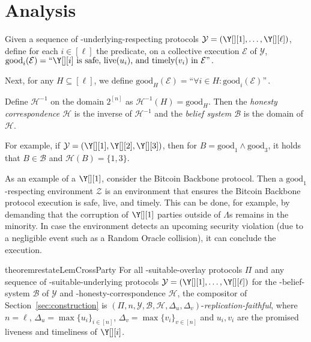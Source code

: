 \section{Analysis}\label{sec:analysis}

\begin{definition}
  Given a sequence of \rollerblade-underlying-respecting
  protocols $\mathcal{Y} = (\Y[][1], \ldots, \Y[][\ell])$,
  define for each $i \in [\ell]$ the predicate, on
  a collective execution $\mathcal{E}$ of $\mathcal{Y}$,
  $
  \text{good}_i(\mathcal{E}) = \text{``} \Y[][i] \text{ is safe, live$(u_i)$, and timely$(v_i)$ in $\mathcal{E}$''}\,.
  $

  Next, for any $H \subseteq [\ell]$, we define
  $
    \text{good}_H(\mathcal{E}) = \text{``}\forall i \in H: \text{good}_i(\mathcal{E})\text{''}\,.
  $

  Define $\mathcal{H}^{-1}$ on the domain $2^{[n]}$ as
  $\mathcal{H}^{-1}(H) = \text{good}_H$.
  Then the \emph{\rollerblade honesty correspondence $\mathcal{H}$}
  is the inverse of $\mathcal{H}^{-1}$ and the \emph{\rollerblade belief system
  $\mathcal{B}$} is the domain of $\mathcal{H}$.
\end{definition}

For example, if $\mathcal{Y} = (\Y[][1], \Y[][2], \Y[][3])$,
then for $B = \text{good}_1 \land \text{good}_3$, it holds that
$B \in \mathcal{B}$ and $\mathcal{H}(B) = \{1, 3\}$.

As an example of a $\Y[][1]$, consider the Bitcoin Backbone protocol.
Then a $\text{good}_1$-respecting environment $\mathcal{Z}$ is an environment
that ensures the Bitcoin Backbone protocol execution is safe, live, and timely.
This can be done, for example, by demanding that the corruption of $\Y[][1]$
parties outside of $\Lambda$s remains in the minority. In case the environment
detects an upcoming security violation (due to a negligible event such as a
Random Oracle collision), it can conclude the execution.

\begin{restatable}[Replication]{theorem}{restateLemCrossParty}\label{thm:replication}
  For all \rollerblade-suitable-overlay protocols $\Pi$
  and any sequence of \rollerblade-suitable-underlying
  protocols $\mathcal{Y} = (\Y[][1], \ldots, \Y[][\ell])$
  for the \rollerblade-belief-system $\mathcal{B}$ of $\mathcal{Y}$
  and \rollerblade-honesty-correspondence $\mathcal{H}$,
  the compositor \rollerblade of Section~\ref{sec:construction} is
  $(\Pi, n, \mathcal{Y}, \mathcal{B}, \mathcal{H}, \Delta_u, \Delta_v)$-\emph{replication-faithful},
  where $n = \ell$, $\Delta_u = \max\{u_i\}_{i \in [n]}$,
  $\Delta_v = \max\{v_i\}_{v \in [n]}$
  and $u_i, v_i$ are the promised liveness and timeliness of $\Y[][i]$.
\end{restatable}

